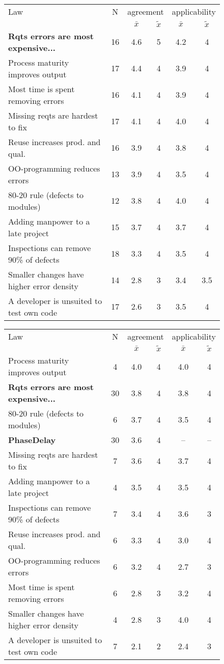 \begin{figure}[!ht]
\renewcommand{\baselinestretch}{0.7}
\scriptsize
\begin{center}
\begin{tabular}{l|c|c|c|c|c}
Law & N & \multicolumn{2}{c}{agreement} & \multicolumn{2}{c}{applicability} \\ 
 & & $\bar{x}$ & $\tilde{x}$ & $\bar{x}$ & $\tilde{x}$ \\
\hline 
\textbf{Rqts errors are most expensive...} & 16 & 4.6 & 5 & 4.2 & 4 \\ 
Process maturity improves output & 17 & 4.4 & 4 & 3.9 & 4 \\ 
Most time is spent removing errors & 16 & 4.1 & 4 & 3.9 & 4 \\ 
Missing reqts are hardest to fix & 17 & 4.1 & 4 & 4.0 & 4 \\
Reuse increases prod. and qual. & 16 & 3.9 & 4 & 3.8 & 4 \\
OO-programming reduces errors & 13 & 3.9 & 4 & 3.5 & 4 \\
80-20 rule (defects to modules) & 12 & 3.8 & 4 & 4.0 & 4 \\
Adding manpower to a late project & 15 & 3.7 & 4 & 3.7 & 4 \\
Inspections can remove 90\% of defects & 18 & 3.3 & 4 & 3.5 & 4 \\
Smaller changes have higher error density & 14 & 2.8 & 3 & 3.4 & 3.5 \\
A developer is unsuited to test own code & 17 & 2.6 & 3 & 3.5 & 4
\end{tabular} 
\bigskip
{}
\begin{tabular}{l|c|c|c|c|c}
Law & N & \multicolumn{2}{c}{agreement} & \multicolumn{2}{c}{applicability} \\ 
 & & $\bar{x}$ & $\tilde{x}$ & $\bar{x}$ & $\tilde{x}$ \\
\hline 
Process maturity improves output & 4 & 4.0 & 4 & 4.0 & 4 \\
\textbf{Rqts errors are most expensive...} & 30 & 3.8 & 4 & 3.8 & 4   \\ 
80-20 rule (defects to modules) & 6 & 3.7 & 4 & 3.5 & 4 \\
\textbf{PhaseDelay} & 30 & 3.6 & 4 & -- & --  \\ 
Missing reqts are hardest to fix & 7 & 3.6 & 4 & 3.7 & 4 \\
Adding manpower to a late project & 4 & 3.5 & 4 & 3.5 & 4 \\
Inspections can remove 90\% of defects & 7 & 3.4 & 4 & 3.6 & 3 \\
Reuse increases prod. and qual. & 6 & 3.3 & 4 & 3.0 & 4 \\
OO-programming reduces errors & 6 & 3.2 & 4 & 2.7 & 3 \\
Most time is spent removing errors & 6 & 2.8 & 3 & 3.2 & 4 \\ 
Smaller changes have higher error density & 4 & 2.8 & 3 & 4.0 & 4 \\
A developer is unsuited to test own code & 7 & 2.1 & 2 & 2.4 & 3
\end{tabular} 


\end{center}
\end{figure}
